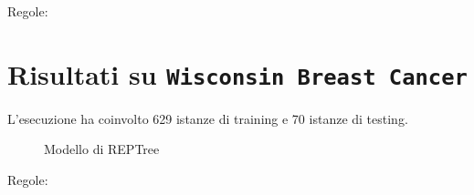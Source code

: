 \begin{mdframed}[frametitle=Esecuzione JRip]
	\scriptsize
\end{mdframed}

%

\noindent
\normalsize Regole:
\scriptsize

\pagebreak

\section{Risultati su \texttt{Wisconsin Breast Cancer}}

\normalsize L'esecuzione ha coinvolto 629 istanze di training e 70 istanze di testing.

\begin{mdframed}[frametitle=Esecuzione REPTree]
	\footnotesize
\end{mdframed}

%

\begin{figure}[htb]
	\caption{Modello di REPTree}
\end{figure}

\begin{mdframed}[frametitle=Esecuzione JRip]
	\footnotesize
\end{mdframed}

%

\noindent
\normalsize Regole:
\footnotesize